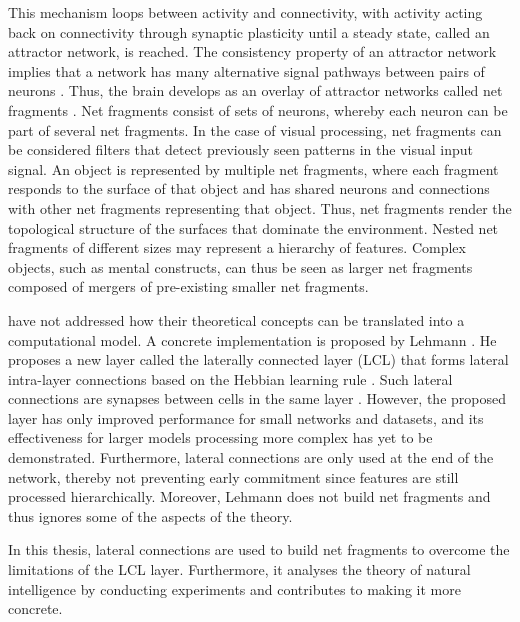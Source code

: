 This mechanism loops between activity and connectivity, with activity acting back on connectivity through synaptic plasticity until a steady state, called an attractor network, is reached.
The consistency property of an attractor network implies that a network has many alternative signal pathways between pairs of neurons .
Thus, the brain develops as an overlay of attractor networks called net fragments .
Net fragments consist of sets of neurons, whereby each neuron can be part of several net fragments.
In the case of visual processing, net fragments can be considered filters that detect previously seen patterns in the visual input signal.
An object is represented by multiple net fragments, where each fragment responds to the surface of that object and has shared neurons and connections with other net fragments representing that object.
Thus, net fragments render the topological structure of the surfaces that dominate the environment.
Nested net fragments of different sizes may represent a hierarchy of features.
Complex objects, such as mental constructs, can thus be seen as larger net fragments composed of mergers of pre-existing smaller net fragments.

 have not addressed how their theoretical concepts can be translated into a computational model.
A concrete implementation is proposed by Lehmann .
He proposes a new layer called the laterally connected layer (LCL) that forms lateral intra-layer connections based on the Hebbian learning rule .
Such lateral connections are synapses between cells in the same layer .
However, the proposed layer has only improved performance for small networks and datasets, and its effectiveness for larger models processing more complex has yet to be demonstrated.
Furthermore, lateral connections are only used at the end of the network, thereby not preventing early commitment since features are still processed hierarchically.
Moreover, Lehmann does not build net fragments and thus ignores some of the aspects of the theory.

In this thesis, lateral connections are used to build net fragments to overcome the limitations of the LCL layer.
Furthermore, it analyses the theory of natural intelligence by conducting experiments and contributes to making it more concrete.

